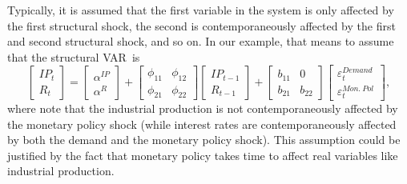\documentclass[10pt]{article}
\begin{document}
Typically, it is assumed that the first variable in the system is only
affected by the first structural shock, the second is contemporaneously
affected by the first and second structural shock, and so on. In our
example, that means to assume that the structural VAR\ is 
\begin{equation}
\begin{bmatrix}
IP_{t} \\ 
R_{t}%
\end{bmatrix}%
=%
\begin{bmatrix}
\alpha ^{IP} \\ 
\alpha ^{R}%
\end{bmatrix}%
+\left[ 
\begin{array}{cc}
\phi _{11} & \phi _{12} \\ 
\phi _{21} & \phi _{22}%
\end{array}%
\right] 
\begin{bmatrix}
IP_{t-1} \\ 
R_{t-1}%
\end{bmatrix}%
+\left[ 
\begin{array}{cc}
b_{11} & 0 \\ 
b_{21} & b_{22}%
\end{array}%
\right] 
\begin{bmatrix}
\varepsilon _{t}^{Demand} \\ 
\varepsilon _{t}^{Mon.\ Pol}%
\end{bmatrix}%
,
\end{equation}%
where note that the industrial production is not contemporaneously affected
by the monetary policy shock (while interest rates are contemporaneously
affected by both the demand and the monetary policy shock). This assumption
could be justified by the fact that monetary policy takes time to affect
real variables like industrial production.
\end{document}
